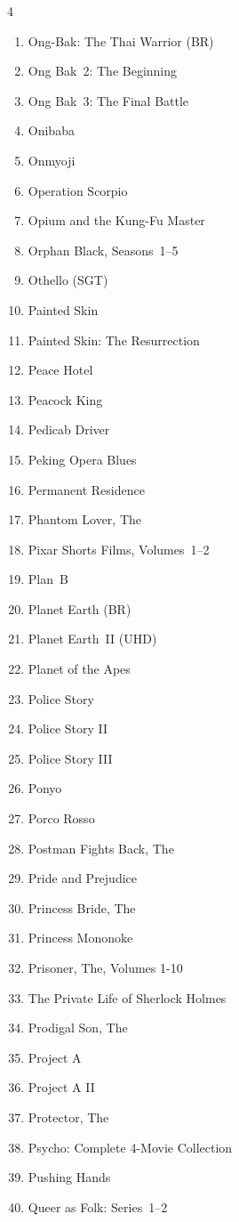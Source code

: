 \documentclass{article}
\begin{document}
\begin{multicols}{4}
\begin{enumerate}
\item Ong-Bak: The Thai Warrior (BR)
\item Ong Bak~2: The Beginning
\item Ong Bak~3: The Final Battle
\item Onibaba
\item Onmyoji
\item Operation Scorpio
\item Opium and the Kung-Fu Master
\item Orphan Black, Seasons~1--5
\item Othello (SGT)
\item Painted Skin
\item Painted Skin: The Resurrection
\item Peace Hotel
\item Peacock King
\item Pedicab Driver
\item Peking Opera Blues
\item Permanent Residence
\item Phantom Lover, The
\item Pixar Shorts Films, Volumes~1--2
\item Plan~B
\item Planet Earth (BR)
\item Planet Earth~II (UHD)
\item Planet of the Apes
\item Police Story
\item Police Story II
\item Police Story III
\item Ponyo
\item Porco Rosso
\item Postman Fights Back, The
\item Pride and Prejudice
\item Princess Bride, The
\item Princess Mononoke
\item Prisoner, The, Volumes 1-10
\item The Private Life of Sherlock Holmes
\item Prodigal Son, The
\item Project A
\item Project A II
\item Protector, The
\item Psycho: Complete 4-Movie Collection
\item Pushing Hands
\item Queer as Folk: Series~1--2

\end{enumerate}
\end{multicols}
\end{document}

